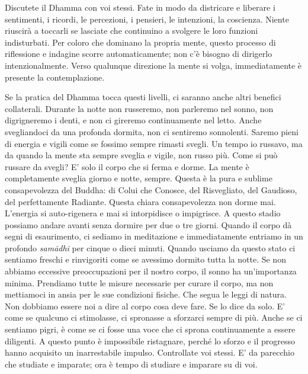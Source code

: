 Discutete il Dhamma con voi stessi. Fate in modo da districare e
liberare i sentimenti, i ricordi, le percezioni, i pensieri, le
intenzioni, la coscienza. Niente riuscirà a toccarli se lasciate che
continuino a svolgere le loro funzioni indisturbati. Per coloro che
dominano la propria mente, questo processo di riflessione e indagine
scorre automaticamente; non c'è bisogno di dirigerlo intenzionalmente.
Verso qualunque direzione la mente si volga, immediatamente è presente
la contemplazione.

Se la pratica del Dhamma tocca questi livelli, ci saranno anche altri
benefici collaterali. Durante la notte non russeremo, non parleremo nel
sonno, non digrigneremo i denti, e non ci gireremo continuamente nel
letto. Anche svegliandoci da una profonda dormita, non ci sentiremo
sonnolenti. Saremo pieni di energia e vigili come se fossimo sempre
rimasti svegli. Un tempo io russavo, ma da quando la mente sta sempre
sveglia e vigile, non russo più. Come si può russare da svegli? E' solo
il corpo che si ferma e dorme. La mente è completamente sveglia giorno e
notte, sempre. Questa è la pura e sublime consapevolezza del Buddha: di
Colui che Conosce, del Risvegliato, del Gaudioso, del perfettamente
Radiante. Questa chiara consapevolezza non dorme mai. L'energia si
auto-rigenera e mai si intorpidisce o impigrisce. A questo stadio
possiamo andare avanti senza dormire per due o tre giorni. Quando il
corpo dà segni di esaurimento, ci sediamo in meditazione e
immediatamente entriamo in un profondo \emph{samādhi} per cinque o dieci
minuti. Quando usciamo da questo stato ci sentiamo freschi e rinvigoriti
come se avessimo dormito tutta la notte. Se non abbiamo eccessive
preoccupazioni per il nostro corpo, il sonno ha un'importanza minima.
Prendiamo tutte le misure necessarie per curare il corpo, ma non
mettiamoci in ansia per le sue condizioni fisiche. Che segua le leggi di
natura. Non dobbiamo essere noi a dire al corpo cosa deve fare. Se lo
dice da solo. E' come se qualcuno ci stimolasse, ci spronasse a
sforzarci sempre di più. Anche se ci sentiamo pigri, è come se ci fosse
una voce che ci sprona continuamente a essere diligenti. A questo punto
è impossibile ristagnare, perché lo sforzo e il progresso hanno
acquisito un inarrestabile impulso. Controllate voi stessi. E' da
parecchio che studiate e imparate; ora è tempo di studiare e imparare su
di voi.

